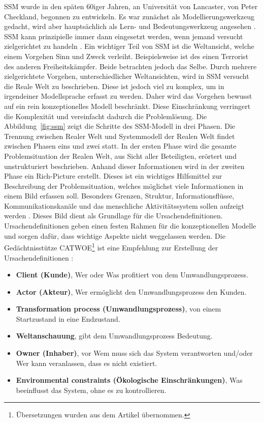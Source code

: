 \documentclass[11pt,a4paper]{report}
\begin{document}
SSM wurde in den späten 60iger Jahren, an Universität von Lancaster, von Peter Checkland, begonnen zu entwickeln. Es war zunächst als Modellierungswerkzeug gedacht, wird aber hauptsächlich als Lern- und Bedeutungswerkzeug angesehen \cite{bobwill}. SSM kann prinzipielle immer dann eingesetzt werden, wenn jemand versucht zielgerichtet zu handeln \cite{checkland1}. Ein wichtiger Teil von SSM ist die Weltansicht, welche einem Vorgehen Sinn und Zweck verleiht. Beispielsweise ist des einen Terrorist des anderen Freiheitskämpfer. Beide betrachten jedoch das Selbe. Durch mehrere zielgerichtete Vorgehen, unterschiedlicher Weltansichten, wird in SSM versucht die Reale Welt zu beschrieben. Diese ist jedoch viel zu komplex, um in irgendeiner Modellsprache erfasst zu werden. Daher wird das Vorgehen bewusst auf ein rein konzeptionelles Modell beschränkt. Diese Einschränkung verringert die Komplexität und vereinfacht dadurch die Problemlösung. Die Abbildung~\ref{fig:ssm} zeigt die Schritte des SSM-Modell in drei Phasen. Die Trennung zwischen Realer Welt und Systemmodell der Realen Welt findet zwischen Phasen eins und zwei statt. In der ersten Phase wird die gesamte Problemsituation der Realen Welt, aus Sicht aller Beteiligten, erörtert und unstrukturiert beschrieben. Anhand dieser Informationen wird in der zweiten Phase ein Rich-Picture erstellt. Dieses ist ein wichtiges Hilfsmittel zur Beschreibung der Problemsituation, welches möglichst viele Informationen in einem Bild erfassen soll. Besonders Grenzen, Struktur, Informationsflüsse, Kommunikationskanäle und das menschliche Aktivitätssystem sollen aufzeigt werden \cite{ssmger}. Dieses Bild dient als Grundlage für die Ursachendefinitionen. Ursachendefinitionen geben einen festen Rahmen für die konzeptionellen Modelle und sorgen dafür, dass wichtige Aspekte nicht weggelassen werden. Die Gedächtnisstütze CATWOE\footnote{Übersetzungen wurden aus dem Artikel \cite{ssmger} übernommen.} ist eine Empfehlung zur Erstellung der Ursachendefinitionen \cite{bobwill}:

\begin{itemize}[leftmargin=*]
\item \textbf{Client (Kunde)}, Wer oder Was profitiert von dem Umwandlungsprozess.
\item \textbf{Actor (Akteur)}, Wer ermöglicht den Umwandlungsprozess den Kunden.
\item \textbf{Transformation process (Umwandlungsprozess)}, von einem Startzustand in eine Endzustand.
\item \textbf{Weltanschauung}, gibt dem Umwandlungsprozess Bedeutung.
\item \textbf{Owner (Inhaber)}, vor Wem muss sich das System verantworten und/oder Wer kann veranlassen, dass es nicht existiert.
\item \textbf{Environmental constraints (Ökologische Einschränkungen)}, Was beeinflusst das System, ohne es zu kontrollieren.
\end{itemize}
\end{document}
